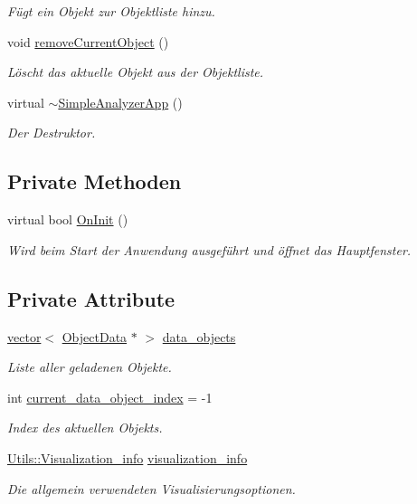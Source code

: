 \begin{DoxyCompactItemize}
\begin{DoxyCompactList}\small\item\em Fügt ein Objekt zur Objektliste hinzu. \end{DoxyCompactList}\item 
void \hyperlink{classSimpleAnalyzerApp_ac78a3ea0f527414f0617d32ab54043f7}{remove\-Current\-Object} ()
\begin{DoxyCompactList}\small\item\em Löscht das aktuelle Objekt aus der Objektliste. \end{DoxyCompactList}\item 
virtual \hyperlink{classSimpleAnalyzerApp_ae0330ceb4781668e020614f5b659766b}{$\sim$\-Simple\-Analyzer\-App} ()
\begin{DoxyCompactList}\small\item\em Der Destruktor. \end{DoxyCompactList}\end{DoxyCompactItemize}
\subsection*{Private Methoden}
\begin{DoxyCompactItemize}
\item 
virtual bool \hyperlink{classSimpleAnalyzerApp_ac98b58650811c7e744eac6cd11d7c157}{On\-Init} ()
\begin{DoxyCompactList}\small\item\em Wird beim Start der Anwendung ausgeführt und öffnet das Hauptfenster. \end{DoxyCompactList}\end{DoxyCompactItemize}
\subsection*{Private Attribute}
\begin{DoxyCompactItemize}
\item 
\hyperlink{classstd_1_1vector}{vector}$<$ \hyperlink{classObjectData}{Object\-Data} $\ast$ $>$ \hyperlink{classSimpleAnalyzerApp_a99bb49d6e0ec4d6f03ad08c29cf63288}{data\-\_\-objects}
\begin{DoxyCompactList}\small\item\em Liste aller geladenen Objekte. \end{DoxyCompactList}\item 
int \hyperlink{classSimpleAnalyzerApp_a79ee2f69d43e2a32ba3c33c2560966e2}{current\-\_\-data\-\_\-object\-\_\-index} = -\/1
\begin{DoxyCompactList}\small\item\em Index des aktuellen Objekts. \end{DoxyCompactList}\item 
\hyperlink{structUtils_1_1Visualization__info}{Utils\-::\-Visualization\-\_\-info} \hyperlink{classSimpleAnalyzerApp_a6cfd36a56cc92ee6cd25512744c6adda}{visualization\-\_\-info}
\begin{DoxyCompactList}\small\item\em Die allgemein verwendeten Visualisierungsoptionen. \end{DoxyCompactList}\end{DoxyCompactItemize}


